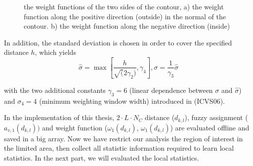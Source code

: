 \begin{figure} 
  \begin{minipage}[t]{0.45\linewidth} 
    \centering 
  \end{minipage}%
  \begin{minipage}[t]{0.45\linewidth} 
    \centering 
  \end{minipage} 
\caption{the weight functions of the two sides of the contour, a) the
  weight function along the positive direction (outside) in the normal of the
  contour. b) the weight function along the negative direction (inside) }
\label{fig:weight}
\end{figure}

In addition, the standard
deviation is chosen in order to cover the specified distance $h$,
which yields 
\begin{equation}
  \label{eq:5.11}
  \hat{\sigma} = \max \left[\frac{h}{\sqrt(2\gamma_2)}, \gamma_4
  \right], \sigma  = \frac{1}{\gamma_3} \hat{\sigma}
\end{equation}

with the two additional constants $\gamma_3 = 6$ (linear dependence
between $\sigma$ and $\hat{\sigma}$) and $\sigma_4 = 4$ (minimum
weighting window width) introduced in (ICVS06). 

In the implementation of this thesis,
$2 \cdot L \cdot N_C$ distance ($d_{k,l}$), fuzzy assignment
($a_{v,1}(d_{k,l}))$ and weight function ($\omega_1(d_{k,l})$,
$\omega_1(d_{k,l})$) are evaluated offline and saved in a big
array. Now we have restrict our analysis the region of interest in the
limited area, then collect all statistic information required to learn
local statistics. In the next part, we will evaluated the local
statistics.

